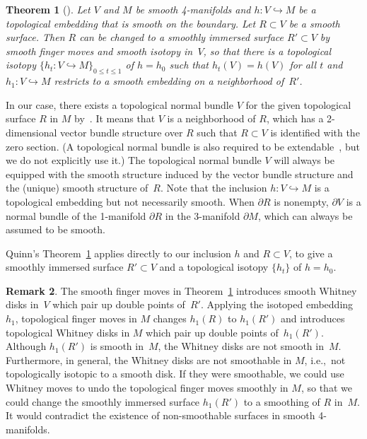 \documentclass[11pt]{amsart}
\newtheorem{theorem}{Theorem}[section]
\theoremstyle{definition}
\newtheorem{remark}[theorem]{Remark}
\theoremstyle{theorem-giventitle}
\theoremstyle{definition-giventitle}
\numberwithin{equation}{section}
\begin{document}
\begin{theorem}[{\cite[8.1A]{Freedman-Quinn:1990-1}}]
  \label{theorem:quinn-finger-move}
  Let $V$ and $M$ be smooth 4-manifolds and $h\colon V \hookrightarrow M$ be a topological embedding that is smooth on the boundary.
  Let $R \subset V$ be a smooth surface.
  Then $R$ can be changed to a smoothly immersed surface $R'\subset V$ by smooth finger moves and smooth isotopy in~$V$, so that there is a topological isotopy $\{h_t\colon V\hookrightarrow M\}_{0\le t \le 1}$ of $h=h_0$ such that $h_t(V)=h(V)$ for all $t$ and $h_1\colon V\hookrightarrow M$ restricts to a smooth embedding on a neighborhood of~$R'$.
\end{theorem}

In our case, there exists a topological normal bundle $V$ for the given topological surface $R$ in $M$ by~\cite[9.3]{Freedman-Quinn:1990-1}.
It means that $V$ is a neighborhood of $R$, which has a 2-dimensional vector bundle structure over $R$ such that $R\subset V$ is identified with the zero section.
(A topological normal bundle is also required to be extendable~\cite[9.3, p.~137]{Freedman-Quinn:1980-1}, but we do not explicitly use it.)
The topological normal bundle $V$ will always be equipped with the smooth structure induced by the vector bundle structure and the (unique) smooth structure of~$R$.
Note that the inclusion $h\colon V\hookrightarrow M$ is a topological embedding but not necessarily smooth.
When $\partial R$ is nonempty, $\partial V$ is a normal bundle of the 1-manifold $\partial R$ in the 3-manifold $\partial M$, which can always be assumed to be smooth.

Quinn's Theorem~\ref{theorem:quinn-finger-move} applies directly to our inclusion $h$ and $R\subset V$, to give a smoothly immersed surface $R'\subset V$ and a topological isotopy $\{h_t\}$ of $h=h_0$.

\begin{remark}
  \label{remark:difficulty-of-undoing-finger-moves}
  The smooth finger moves in Theorem~\ref{theorem:quinn-finger-move} introduces smooth Whitney disks in~$V$ which pair up double points of~$R'$.
  Applying the isotoped embedding $h_1$, topological finger moves in $M$ changes $h_1(R)$ to $h_1(R')$ and introduces topological Whitney disks in $M$ which pair up double points of~$h_1(R')$.
  Although $h_1(R')$ is smooth in~$M$, the Whitney disks are not smooth in~$M$.
  Furthermore, in general, the Whitney disks are not smoothable in $M$, i.e.,\ not topologically isotopic to a smooth disk.
  If they were smoothable, we could use Whitney moves to undo the topological finger moves smoothly in $M$, so that we could change the smoothly immersed surface $h_1(R')$ to a smoothing of $R$ in~$M$.
  It would contradict the existence of non-smoothable surfaces in smooth 4-manifolds.
\end{remark}
\end{document}
